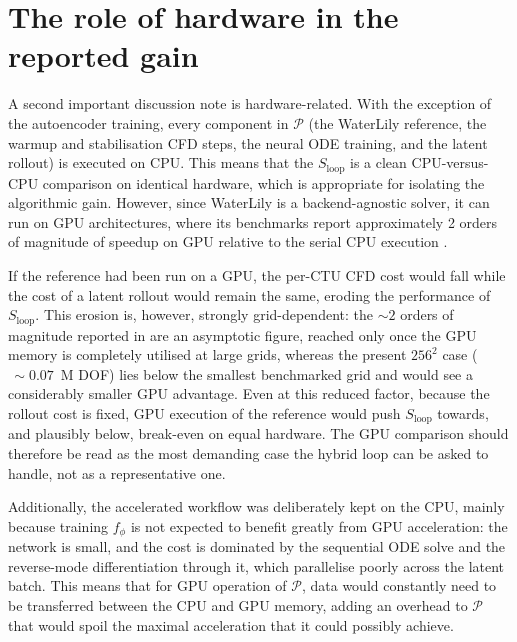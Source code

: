 \section{The role of hardware in the reported gain}
\label{sect: disc_hardware}

A second important discussion note is hardware-related. With the exception of the autoencoder training, every component in $\mathcal{P}$ (the WaterLily reference, the warmup and stabilisation CFD steps, the neural ODE training, and the latent rollout) is executed on CPU. This means that the $S_\text{loop}$ is a clean CPU-versus-CPU comparison on identical hardware, which is appropriate for isolating the algorithmic gain. However, since WaterLily is a backend-agnostic solver, it can run on GPU architectures, where its benchmarks report approximately 2 orders of magnitude of speedup on GPU relative to the serial CPU execution \cite{Weymouth2025}. 

If the reference had been run on a GPU, the per-CTU CFD cost would fall while the cost of a latent rollout would remain the same, eroding the performance of $S_\text{loop}$. This erosion is, however, strongly grid-dependent: the ${\sim}2$ orders of magnitude reported in \cite{Weymouth2025} are an asymptotic figure, reached only once the GPU memory is completely utilised at large grids, whereas the present $256^2$ case ($\,{\sim}0.07$~M DOF) lies below the smallest benchmarked grid and would see a considerably smaller GPU advantage. Even at this reduced factor, because the rollout cost is fixed, GPU execution of the reference would push $S_\text{loop}$ towards, and plausibly below, break-even on equal hardware. The GPU comparison should therefore be read as the most demanding case the hybrid loop can be asked to handle, not as a representative one.


Additionally, the accelerated workflow was deliberately kept on the CPU, mainly because training $f_\phi$ is not expected to benefit greatly from GPU acceleration: the network is small, and the cost is dominated by the sequential ODE solve and the reverse-mode differentiation through it, which parallelise poorly across the latent batch. This means that for GPU operation of $\mathcal{P}$, data would constantly need to be transferred between the CPU and GPU memory, adding an overhead to $\mathcal{P}$ that would spoil the maximal acceleration that it could possibly achieve. 


